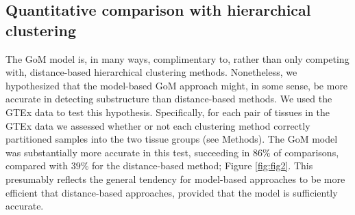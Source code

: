 




\subsection{Quantitative comparison with hierarchical clustering}

The GoM model is, in many ways,  complimentary to, rather than only competing with, distance-based hierarchical clustering methods.
Nonetheless, we hypothesized that the model-based GoM approach might, in some sense, be more accurate in detecting substructure than distance-based methods. 
We used the GTEx data to test this hypothesis. Specifically, for each pair of tissues in the GTEx data we assessed whether or not each clustering method
correctly partitioned samples into the two tissue groups (see Methods). The GoM model was substantially more accurate in this test, succeeding
in $86 \%$ of comparisons, compared with $39 \%$ for the distance-based method; Figure \ref{fig:fig2}. This presumably reflects the general tendency for model-based
approaches to be more efficient that distance-based approaches, provided that the model is sufficiently accurate.



